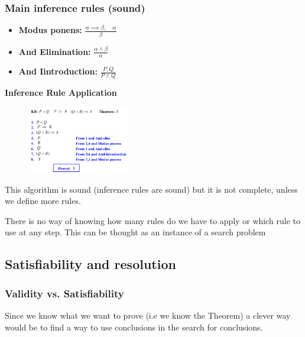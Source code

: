 \subsubsection{Main inference rules (sound)}
\begin{itemize}
    \item \textbf{Modus ponens: } $\frac{\alpha\implies\beta,\quad \alpha}{\beta}$
    \item \textbf{And Elimination: } $\frac{\alpha\land\beta}{\alpha}$
    \item \textbf{And Iintroduction: } $\frac{P, Q}{P\land Q}$
\end{itemize}

\textbf{Inference Rule Application}
\begin{figure}[H]
    \centering
    \includegraphics[width=0.4\textwidth]{img/ruleapplication.png}
\end{figure}
This algorithm is sound (inference rules are sound) but it is not complete, unless we define more rules.

There is no way of knowing how many rules do we have to apply or which rule to use at any step.
This can be thought as an instance of a search problem
\subsection{Satisfiability and resolution}
\subsubsection{Validity vs. Satisfiability}
Since we know what we want to prove (i.e we know the Theorem) a clever way would be to find a way to use conclusions in the search for conclusions.

